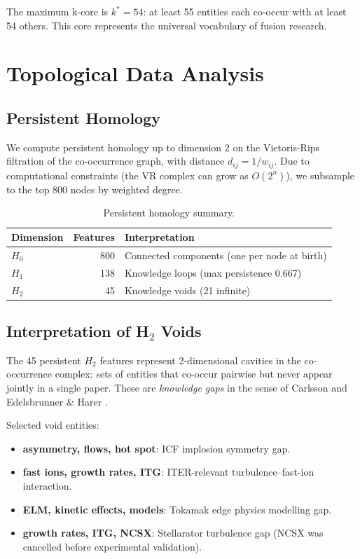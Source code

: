 \documentclass[11pt,a4paper]{article}
\begin{document}
The maximum k-core is $k^* = 54$: at least 55 entities each co-occur with at least 54 others.  This core represents the universal vocabulary of fusion research.

\section{Topological Data Analysis}

\subsection{Persistent Homology}

We compute persistent homology up to dimension 2 on the Vietoris-Rips filtration of the co-occurrence graph, with distance $d_{ij} = 1/w_{ij}$.  Due to computational constraints (the VR complex can grow as $O(2^n)$), we subsample to the top 800 nodes by weighted degree.

\begin{table}[h]
\centering
\begin{tabular}{lrl}
\toprule
Dimension & Features & Interpretation \\
\midrule
$H_0$ & 800 & Connected components (one per node at birth) \\
$H_1$ & 138 & Knowledge loops (max persistence 0.667) \\
$H_2$ & 45 & Knowledge voids (21 infinite) \\
\bottomrule
\end{tabular}
\caption{Persistent homology summary.}
\label{tab:tda}
\end{table}

\subsection{Interpretation of H$_2$ Voids}

The 45 persistent $H_2$ features represent 2-dimensional cavities in the co-occurrence complex: sets of entities that co-occur pairwise but never appear jointly in a single paper.  These are \emph{knowledge gaps} in the sense of Carlsson \citep{carlsson2009} and Edelsbrunner \& Harer \citep{edelsbrunner2010}.

Selected void entities:
\begin{itemize}
  \item \textbf{asymmetry, flows, hot spot}: ICF implosion symmetry gap.
  \item \textbf{fast ions, growth rates, ITG}: ITER-relevant turbulence--fast-ion interaction.
  \item \textbf{ELM, kinetic effects, models}: Tokamak edge physics modelling gap.
  \item \textbf{growth rates, ITG, NCSX}: Stellarator turbulence gap (NCSX was cancelled before experimental validation).
\end{itemize}
\end{document}
